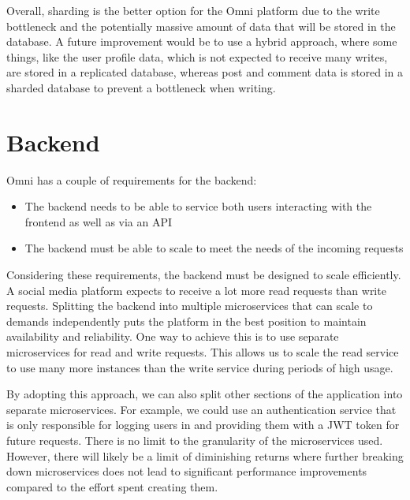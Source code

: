 Overall, sharding is the better option for the Omni platform due to the write bottleneck and the potentially massive amount of data that will be stored in the database.
A future improvement would be to use a hybrid approach, where some things, like the user profile data, which is not expected to receive many writes, are stored in a replicated database, whereas post and comment data is stored in a sharded database to prevent a bottleneck when writing.


\section{Backend}
\label{sec:design-system-backend}
Omni has a couple of requirements for the backend:
\begin{itemize}
    \item The backend needs to be able to service both users interacting with the frontend as well as via an API
    \item The backend must be able to scale to meet the needs of the incoming requests
\end{itemize}
Considering these requirements, the backend must be designed to scale efficiently. A social media platform expects to receive a lot more read requests than write requests.
Splitting the backend into multiple microservices that can scale to demands independently puts the platform in the best position to maintain availability and reliability. 
One way to achieve this is to use separate microservices for read and write requests. This allows us to scale the read service to use many more instances than the write service during periods of high usage. 

By adopting this approach, we can also split other sections of the application into separate microservices.
For example, we could use an authentication service that is only responsible for logging users in and providing them with a JWT token for future requests.
There is no limit to the granularity of the microservices used.
However, there will likely be a limit of diminishing returns where further breaking down microservices does not lead to significant performance improvements compared to the effort spent creating them.

